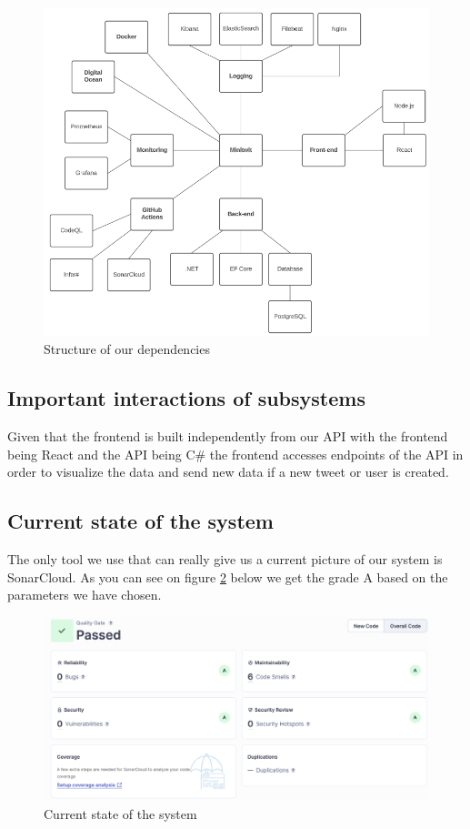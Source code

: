 \documentclass{article}
\begin{document}
\begin{figure}[H]
    \centering
     \includegraphics[width=\textwidth]{images/dependencies.png}
    \caption{Structure of our dependencies}
    \label{fig:dependencies}
\end{figure}

\newpage
\subsection{Important interactions of subsystems}
Given that the frontend is built independently from our API with the frontend being React and the API being C\# the frontend accesses endpoints of the API in order to visualize the data and send new data if a new tweet or  user is created. 
\subsection{Current state of the system}
The only tool we use that can really give us a current picture of our system is SonarCloud. As you can see on figure \ref{fig:sonarcloud} below we get the grade A based on the parameters we have chosen. 
\begin{figure}[H]
    \centering
     \includegraphics[width=\textwidth]{images/sonarcloud.png}
    \caption{Current state of the system}
    \label{fig:sonarcloud}
\end{figure}
\end{document}
